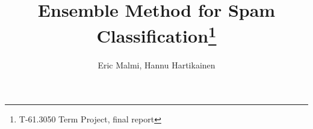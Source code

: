\documentclass[12pt,a4paper,finnish,oneside]{article}
\begin{document}


\pagestyle{plain}



\author{Eric Malmi, Hannu Hartikainen}
\title{Ensemble Method for Spam Classification\thanks{T-61.3050 Term Project, final report}}

\maketitle



\clearpage




\clearpage



\tableofcontents
\label{pages-prelude}
\clearpage



\pagestyle{headings}








\clearpage



\nocite{*}


%





%
\end{document}
